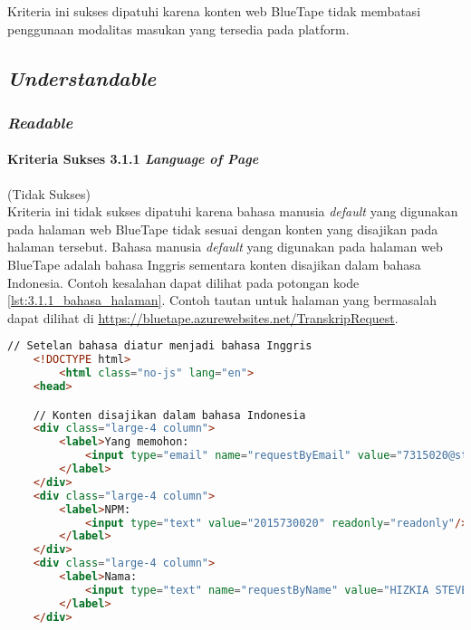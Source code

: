 Kriteria ini sukses dipatuhi karena konten web BlueTape tidak membatasi penggunaan modalitas masukan yang tersedia pada platform.

\subsection{\textit{Understandable}}
\label{subsec:kepatuhan_bluetape_understandable}

\subsubsection{\textit{Readable}}
\label{subsubsec:kepatuhan_bluetape_readable}

\paragraph{Kriteria Sukses 3.1.1 \textit{Language of Page}}
\label{par:kepatuhan_bluetape_kriteria_sukses_3.1.1}
(Tidak Sukses)\\

Kriteria ini tidak sukses dipatuhi karena bahasa manusia \textit{default} yang digunakan pada halaman web BlueTape tidak sesuai dengan konten yang disajikan pada halaman tersebut. Bahasa manusia \textit{default} yang digunakan pada halaman web BlueTape adalah bahasa Inggris sementara konten disajikan dalam bahasa Indonesia. Contoh kesalahan dapat dilihat pada potongan kode \ref{lst:3.1.1_bahasa_halaman}. Contoh tautan untuk halaman yang bermasalah dapat dilihat di \url{https://bluetape.azurewebsites.net/TranskripRequest}.

\begin{lstlisting}[frame=single, label={lst:3.1.1_bahasa_halaman}, language=HTML, caption=Kriteria Sukses 3.1.1 - Bahasa yang Tidak Sesuai]
    // Setelan bahasa diatur menjadi bahasa Inggris
    <!DOCTYPE html>
        <html class="no-js" lang="en">
    <head>

    // Konten disajikan dalam bahasa Indonesia
    <div class="large-4 column">
        <label>Yang memohon:
            <input type="email" name="requestByEmail" value="7315020@student.unpar.ac.id" readonly="readonly"/>
        </label>
    </div>
    <div class="large-4 column">
        <label>NPM:
            <input type="text" value="2015730020" readonly="readonly"/>
        </label>
    </div>
    <div class="large-4 column">
        <label>Nama:
            <input type="text" name="requestByName" value="HIZKIA STEVEN" readonly="readonly"/>
        </label>
    </div>
\end{lstlisting}

